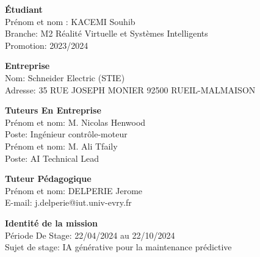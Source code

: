


\noindent \textbf{Étudiant} \\
Prénom et nom : KACEMI Souhib \\
Branche: M2 Réalité Virtuelle et Systèmes Intelligents \\
Promotion: 2023/2024 \\

\vspace{1cm}

\noindent \textbf{Entreprise} \\
Nom: Schneider Electric (STIE) \\
Adresse: 35 RUE JOSEPH MONIER 92500 RUEIL-MALMAISON \\

\vspace{1cm}

\noindent \textbf{Tuteurs En Entreprise} \\
Prénom et nom: M.  Nicolas Henwood\\
Poste: Ingénieur contrôle-moteur \\


\noindent Prénom et nom: M. Ali Tfaily \\
Poste: AI Technical Lead \\


\vspace{1cm}

\noindent \textbf{Tuteur Pédagogique} \\
Prénom et nom: DELPERIE Jerome \\
E-mail: j.delperie@iut.univ-evry.fr \\

\vspace{1cm}

\noindent \textbf{Identité de la mission} \\
Période De Stage: 22/04/2024 au 22/10/2024 \\
Sujet de stage: IA générative pour la maintenance prédictive \\

\clearpage